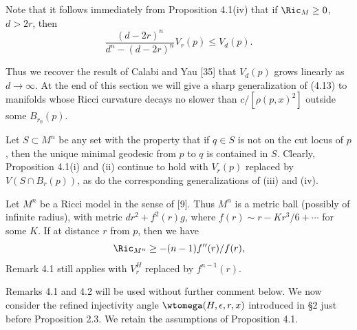 Note that it follows immediately from Proposition 4.1(iv) that if
$\Ric_M\ge 0$, $d>2r$, then
\begin{equation}
\tag{4.13}
\frac{(d-2r)^n}{d^n-(d-2r)^n}V_r(p)\le V_d(p).
\end{equation}

Thus we recover the result of Calabi and Yau [35] that $V_d(p)$ grows linearly
as $d\to\infty$. At the end of this section we will give a sharp generalization
of (4.13) to manifolds whose Ricci curvature decays no slower than
$c/[\rho(p,x)^2]$ outside some $B_{r_0}(p)$.

\begin{remark}
\label{rem:relative-volume-star-shaped}

Let $S\subset M^n$ be any set with the property that if
$q\in S$ is not on the cut locus of $p$, then the unique minimal geodesic from $p$
to $q$ is contained in $S$. Clearly, Proposition 4.1(i) and (ii) continue to
hold with $V_r(p)$ replaced by $V(S\cap B_r(p))$, as do the corresponding
generalizations of (iii) and (iv).
\end{remark}

\begin{remark}
\label{rem:ricci-models}

Let $M^n$ be a Ricci model in the sense of [9]. Thus $M^n$ is a metric ball
(possibly of infinite radius), with metric $dr^2+f^2(r)g$, where $f(r)\sim
r-Kr^3/6+\cdots$ for some $K$. If at distance $r$ from $p$, then we have
\[
\Ric_{M^n}\ge -(n-1)f''(r)/f(r),
\]
Remark 4.1 still applies with $V_r^H$ replaced by $f^{n-1}(r)$.
\end{remark}

Remarks 4.1 and 4.2 will be used without further comment below.
We now consider the refined injectivity angle $\wtomega(H,\epsilon,r,x)$
introduced in \S2 just before Proposition 2.3. We retain the assumptions of
Proposition 4.1.

